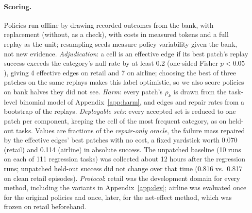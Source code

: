 \documentclass[11pt]{article}
\begin{document}
\paragraph{Scoring.} Policies run offline by drawing recorded outcomes from the bank, with replacement (without, as a check), with costs in measured tokens and a full replay as the unit; resampling seeds measure policy variability given the bank, not new evidence. \emph{Adjudication}: a cell is an effective edge if its best patch's replay success exceeds the category's null rate by at least 0.2 (one-sided Fisher $p<0.05$), giving 4 effective edges on retail and 7 on airline; choosing the best of three patches on the same replays makes this label optimistic, so we also score policies on bank halves they did not see. \emph{Harm}: every patch's $\rho_k$ is drawn from the task-level binomial model of Appendix~\ref{app:harm}, and edges and repair rates from a bootstrap of the replays. \emph{Deployable sets}: every accepted set is reduced to one patch per component, keeping the cell of the most frequent category, as on held-out tasks. Values are fractions of the \emph{repair-only oracle}, the failure mass repaired by the effective edges' best patches with no cost, a fixed yardstick worth 0.070 (retail) and 0.114 (airline) in absolute success. The unpatched baseline (10 runs on each of 111 regression tasks) was collected about 12 hours after the regression runs; unpatched held-out success did not change over that time (0.816 vs.\ 0.817 on clean retail episodes). \emph{Protocol}: retail was the development domain for every method, including the variants in Appendix~\ref{app:dev}; airline was evaluated once for the original policies and once, later, for the net-effect method, which was frozen on retail beforehand.
\end{document}

